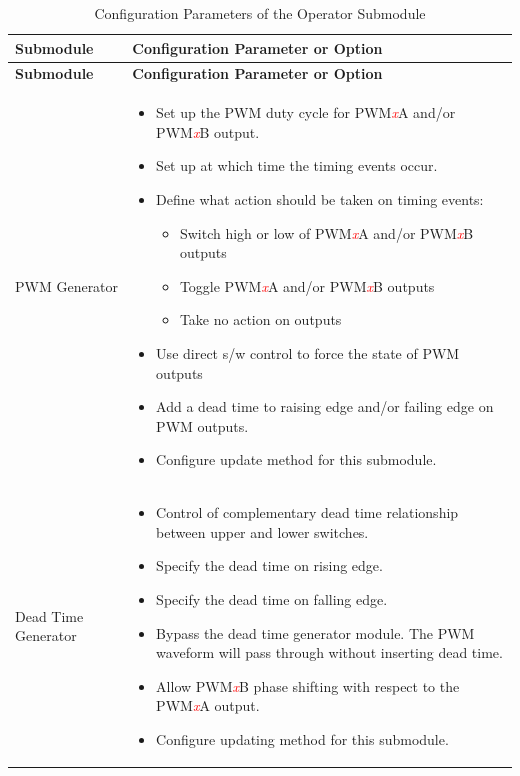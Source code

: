 \begin{longtable}[c]{|m{5cm}|m{10cm}|}
\caption{Configuration Parameters of the Operator Submodule}
\label{tab:mcpwm-param-operator}
    \\\hline
    \rowcolor{lightgray}
   \textbf{Submodule} & \textbf{Configuration Parameter or Option} \\ \hline 

\endfirsthead\hline
 \rowcolor{lightgray}
   \textbf{Submodule} & \textbf{Configuration Parameter or Option}\\
 \hline 
\endhead
\endfoot
    PWM Generator &\vspace{-1em}
    \begin{itemize}
        \item Set up the PWM duty cycle for PWM\textcolor{red}{\it{x}}A and/or PWM\textcolor{red}{\it{x}}B output.
        \item Set up at which time the timing events occur.
        \item Define what action should be taken on timing events:
        \begin{itemize}
           \item Switch high or low of PWM\textcolor{red}{\it{x}}A and/or PWM\textcolor{red}{\it{x}}B outputs
           \item Toggle PWM\textcolor{red}{\it{x}}A and/or PWM\textcolor{red}{\it{x}}B outputs
           \item Take no action on outputs
        \end{itemize}
        \item Use direct s/w control to force the state of PWM outputs
        \item Add a dead time to raising edge and/or failing edge on PWM outputs.
        \item Configure update method for this submodule.\vspace{-1em}
    \end{itemize}\\\hline
    
    Dead Time Generator &\vspace{-1em}
    \begin{itemize}
        \item Control of complementary dead time relationship between upper and lower switches.
        \item Specify the dead time on rising edge.
        \item Specify the dead time on falling edge.
        \item Bypass the dead time generator module. The PWM waveform will pass through without inserting dead time.
        \item Allow PWM\textcolor{red}{\it{x}}B phase shifting with respect to the PWM\textcolor{red}{\it{x}}A output.
        \item Configure updating method for this submodule.\vspace{-1em}
    \end{itemize}\\\hline
    

\end{longtable}
